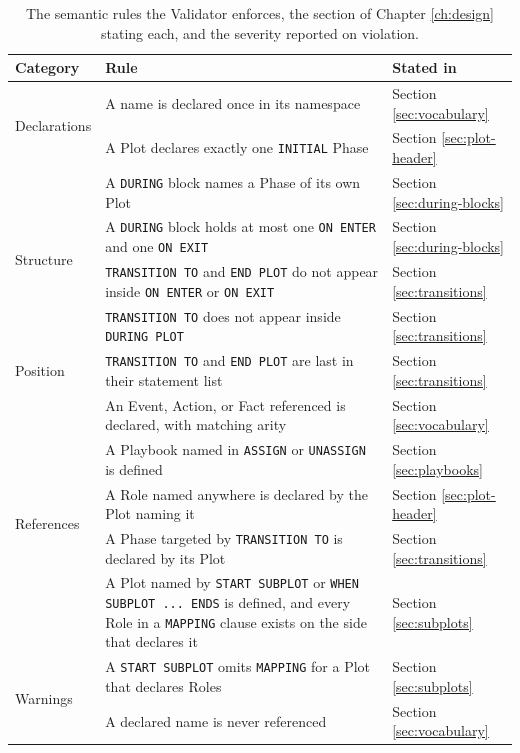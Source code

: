 \begin{table}[htpb]
\centering
\small
\begin{tabular}{|p{2.2cm}|p{6.6cm}|p{3.1cm}|}
\hline
\textbf{Category} & \textbf{Rule} & \textbf{Stated in} \\
\hline
\multirow{2}{2.2cm}{Declarations}
 & A name is declared once in its namespace & Section \ref{sec:vocabulary} \\
\cline{2-3}
 & A Plot declares exactly one \lstinline|INITIAL| Phase & Section \ref{sec:plot-header} \\
\hline
\multirow{4}{2.2cm}{Structure}
 & A \lstinline|DURING| block names a Phase of its own Plot & Section \ref{sec:during-blocks} \\
\cline{2-3}
 & A \lstinline|DURING| block holds at most one \lstinline|ON ENTER| and one \lstinline|ON EXIT| & Section \ref{sec:during-blocks} \\
\cline{2-3}
 & \lstinline|TRANSITION TO| and \lstinline|END PLOT| do not appear inside \lstinline|ON ENTER| or \lstinline|ON EXIT| & Section \ref{sec:transitions} \\
\cline{2-3}
 & \lstinline|TRANSITION TO| does not appear inside \lstinline|DURING PLOT| & Section \ref{sec:transitions} \\
\hline
Position
 & \lstinline|TRANSITION TO| and \lstinline|END PLOT| are last in their statement list & Section \ref{sec:transitions} \\
\hline
\multirow{5}{2.2cm}{References}
 & An Event, Action, or Fact referenced is declared, with matching arity & Section \ref{sec:vocabulary} \\
\cline{2-3}
 & A Playbook named in \lstinline|ASSIGN| or \lstinline|UNASSIGN| is defined & Section \ref{sec:playbooks} \\
\cline{2-3}
 & A Role named anywhere is declared by the Plot naming it & Section \ref{sec:plot-header} \\
\cline{2-3}
 & A Phase targeted by \lstinline|TRANSITION TO| is declared by its Plot & Section \ref{sec:transitions} \\
\cline{2-3}
 & A Plot named by \lstinline|START SUBPLOT| or \lstinline|WHEN SUBPLOT ... ENDS| is defined, and every Role in a \lstinline|MAPPING| clause exists on the side that declares it & Section \ref{sec:subplots} \\
\hline
\multirow{2}{2.2cm}{Warnings}
 & A \lstinline|START SUBPLOT| omits \lstinline|MAPPING| for a Plot that declares Roles & Section \ref{sec:subplots}  \\
\cline{2-3}
 & A declared name is never referenced & Section \ref{sec:vocabulary} \\
\hline
\end{tabular}
\caption{The semantic rules the Validator enforces, the section of Chapter \ref{ch:design} stating each, and the severity reported on violation.}
\label{tab:validation-rules}
\end{table}
 
